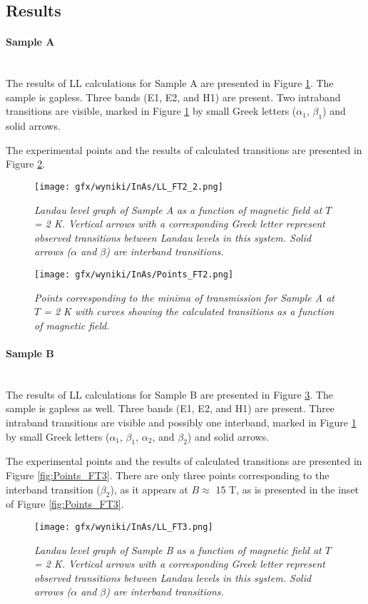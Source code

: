 \documentclass[titlepage,a4paper]{book}
\newcommand{\wciecie}{\quad\phantom{v}}
\newcommand{\myparagraph}[1]{\paragraph{#1}\mbox{}\\}
\begin{document}
\subsection{Results}
\myparagraph{Sample A}
\wciecie
The results of LL calculations for Sample A are presented in Figure \ref{fig:LL_FT2}. The sample is gapless. Three bands (E1, E2, and H1) are present. Two intraband transitions are visible, marked in Figure \ref{fig:LL_FT2} by small Greek letters ($\alpha_1$, $\beta_1$) and solid arrows. 

The experimental points and the results of calculated transitions are presented in Figure \ref{fig:Points_FT2}. 

\begin{figure}[ht]
	\centering
	\texttt{[image: gfx/wyniki/InAs/LL\_FT2\_2.png]}
	\vspace{-10pt}
	\caption{\textit{Landau level graph of Sample A as a function of magnetic field at $T$ = 2 K. Vertical arrows with a corresponding Greek letter represent observed transitions between Landau levels in this system. Solid arrows ($\alpha$ and $\beta$) are interband transitions.}}
	\label{fig:LL_FT2}
\end{figure}

\begin{figure}[H]
	\centering
	\texttt{[image: gfx/wyniki/InAs/Points\_FT2.png]}
	\vspace{-10pt}
	\caption{\textit{Points corresponding to the minima of transmission for Sample A at $T$ = 2 K with curves showing the calculated transitions as a function of magnetic field.}}
	\label{fig:Points_FT2}
\end{figure}


\myparagraph{Sample B}
\wciecie
The results of LL calculations for Sample B are presented in Figure \ref{fig:LL_FT3}. The sample is gapless as well. Three bands (E1, E2, and H1) are present. Three intraband transitions are visible and possibly one interband, marked in Figure \ref{fig:LL_FT2} by small Greek letters ($\alpha_1$, $\beta_1$, $\alpha_2$, and $\beta_2$) and solid arrows. 

The experimental points and the results of calculated transitions are presented in Figure \ref{fig:Points_FT3}. There are only three points corresponding to the interband transition ($\beta_2$), as it appears at $B \approx$ 15 T, as is presented in the inset of Figure \ref{fig:Points_FT3}.  

\begin{figure}[H]
	\centering
	\texttt{[image: gfx/wyniki/InAs/LL\_FT3.png]}
	\vspace{-10pt}
	\caption{\textit{Landau level graph of Sample B as a function of magnetic field at $T$ = 2 K. Vertical arrows with a corresponding Greek letter represent observed transitions between Landau levels in this system. Solid arrows ($\alpha$ and $\beta$) are interband transitions.}}
	\label{fig:LL_FT3}
\end{figure}
\end{document}
